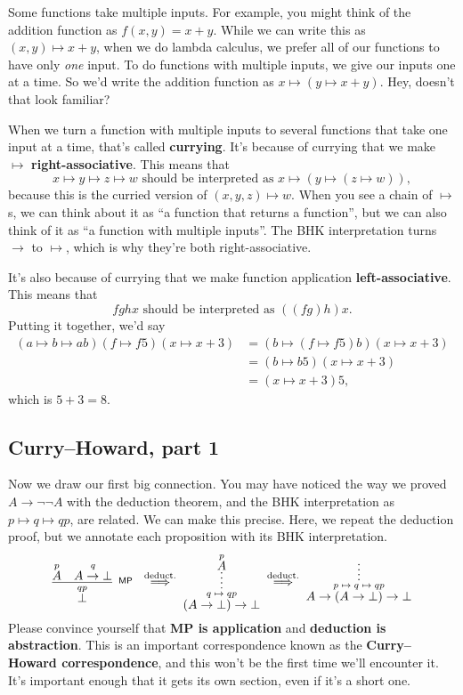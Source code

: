 \documentclass[11pt,paper=letter]{scrartcl}
\renewcommand{\sf}{\mathsf}
\renewcommand{\lnot}{\neg}
\newcommand{\false}{\bot}
\newcommand{\vc}[1]{\vcenter{\hbox{#1}}}
\begin{document}
Some functions take multiple inputs. For example, you might think of the addition function as $f(x, y) = x + y$. While we can write this as $(x, y) \mapsto x + y$, when we do lambda calculus, we prefer all of our functions to have only \emph{one} input. To do functions with multiple inputs, we give our inputs one at a time. So we'd write the addition function as $x \mapsto (y \mapsto x + y)$. Hey, doesn't that look familiar?

When we turn a function with multiple inputs to several functions that take one input at a time, that's called \textbf{currying}. It's because of currying that we make $\mapsto$ \textbf{right-associative}. This means that \[
  x \mapsto y \mapsto z \mapsto w
  \text{ should be interpreted as }
  x \mapsto (y \mapsto (z \mapsto w)),
\]
because this is the curried version of $(x, y, z) \mapsto w$. When you see a chain of $\mapsto$s, we can think about it as ``a function that returns a function'', but we can also think of it as ``a function with multiple inputs''. The BHK interpretation turns $\to$ to $\mapsto$, which is why they're both right-associative.

It's also because of currying that we make function application \textbf{left-associative}. This means that \[
  fghx \text{ should be interpreted as } ((fg)h)x.
\]
Putting it together, we'd say
\begin{align*}
(a \mapsto b \mapsto ab)(f \mapsto f5)(x \mapsto x + 3)
&= (b \mapsto (f \mapsto f5)b)(x \mapsto x + 3) \\
&= (b \mapsto b5)(x \mapsto x + 3)\\
&= (x \mapsto x + 3)5,
\end{align*}
which is $5 + 3 = 8$.

\subsection{Curry--Howard, part 1}

Now we draw our first big connection. You may have noticed the way we proved $A \to \lnot\lnot A$ with the deduction theorem, and the BHK interpretation as $p \mapsto q \mapsto qp$, are related. We can make this precise. Here, we repeat the deduction proof, but we annotate each proposition with its BHK interpretation.
\begin{align*}
\vc{\infer[^\sf{MP}]
{
\overset{qp}{\false}
}
{\overset{p}{A} & \overset{q}{A \to \false}}
}
\;\overset{\text{deduct.}}{\implies}\;
\vc{\infer*
{\overset{q\;\mapsto\;qp}{(A \to \false) \to \false}}
{\overset{p}{A}}}
\;\overset{\text{deduct.}}{\implies}\;
\vc{\infer*
{\overset{p\;\mapsto\;q\;\mapsto\;qp}{A \to (A \to \false) \to \false}}
{}}
\end{align*}
Please convince yourself that \textbf{\textsf{MP} is application} and \textbf{deduction is abstraction}. This is an important correspondence known as the \textbf{Curry--Howard correspondence}, and this won't be the first time we'll encounter it. It's important enough that it gets its own section, even if it's a short one.
\end{document}
